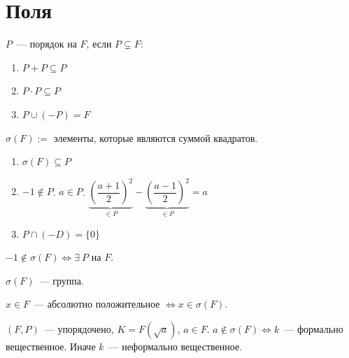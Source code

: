 \documentclass[12pt]{article}
\begin{document}
    \section{Поля}
    
    \begin{definition}[Порядок]
    	$P$~--- порядок на $F$, если $P \subsetneq F$:
		\begin{enumerate}
			\item $P + P \subseteq P$
			\item $P \cdot P \subseteq P$
			\item $P \cup (-P) = F$
		\end{enumerate}
    \end{definition}
    
    \begin{definition}
    	$\sigma(F) :=$ элементы, которые являются суммой квадратов.
    \end{definition}
    
    \begin{statement}
    	\begin{enumerate}
			\item $\sigma(F) \subseteq P$
			\item $-1 \notin P$. $a \in P$. $\underbrace{\left( \dfrac{a + 1}{2} \right)^2}_{\in P} - \underbrace{\left( \dfrac{a - 1}{2} \right)^2}_{\in P} = a$
			\item $P \cap (-D) = \{ 0 \}$
		\end{enumerate}
    \end{statement}
    
    \begin{theorem}
    	$-1 \notin \sigma(F) \Leftrightarrow \exists \ P$ на $F$.
    \end{theorem}
    
    \begin{statement}
    	$\sigma(F)$~--- группа.
    \end{statement}
    
    \begin{theorem}
    	$x \in F$~--- абсолютно положительное $\Leftrightarrow x \in \sigma(F)$.
    \end{theorem}
    
    \begin{lemma}
    	$(F, P)$~--- упорядочено, $K = F(\sqrt{a})$, $a \in F$. $a \notin \sigma(F) \Leftrightarrow k$~--- формально вещественное. Иначе $k$~--- неформально вещественное.
    \end{lemma}
    
\end{document}
